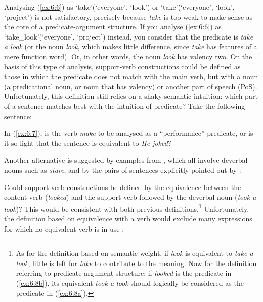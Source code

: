 \documentclass[output=paper]{langsci/langscibook}
\begin{document}
\noindent Analysing (\ref{ex:6:6}) as ‘take’(‘everyone’, ‘look’) or ‘take’(‘everyone’, ‘look’, ‘project’) is not satisfactory, precisely because \textit{take} is too weak to make sense as the core of a predicate-argument structure. If you analyse (\ref{ex:6:6}) as ‘take\_look’(‘everyone’, ‘project’) instead, you consider that the predicate is\textit{ take a look} (or the noun \textit{look}, which makes little difference, since \textit{take} has features of a mere function word). Or, in other words, the noun \textit{look} has valency two. On the basis of this type of analysis, support-verb constructions could be defined as those in which the predicate does not match with the main verb, but with a noun (a predicational noun, or noun that has valency) or another part of speech (PoS). Unfortunately, this definition still relies on a shaky semantic intuition: which part of a sentence matches best with the intuition of predicate? Take the following sentence:


\begin{exe}
\end{exe}
In (\ref{ex:6:7}), is the verb \textit{make} to be analysed as a “performance” predicate, or is it so light that the sentence is equivalent to \textit{He joked}?

Another alternative is suggested by examples from \citet{Jespersen1942}, which all involve deverbal nouns such as \textit{stare}, and by the pairs of sentences explicitly pointed out by \cite[17--19]{Harris1964}:

\begin{exe}
\ex  \begin{xlist}  
 \end{xlist}
 \end{exe}

\noindent Could support-verb constructions be defined by the equivalence between the content verb (\textit{looked}) and the support-verb followed by the deverbal noun (\textit{took a look})? This would be consistent with both previous definitions.\footnote{As for the definition based on semantic weight, if \textit{look} is equivalent to \textit{take a look}, little is left for \textit{take} to contribute to the meaning. Now for the definition referring to predicate-argument structure: if \textit{looked} is the predicate in (\ref{ex:6:8b}), its equivalent \textit{took a look} should logically be considered as the predicate in (\ref{ex:6:8a}).} Unfortunately, the definition based on equivalence with a verb would exclude many expressions for which no equivalent verb is in use \citep{Labelle1974}: 
\end{document}
